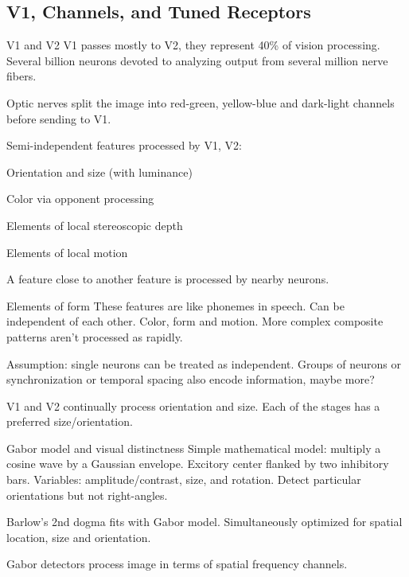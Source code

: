 \begin{mdframed}\begin{multicols}{2}
\subsection{V1, Channels, and Tuned Receptors}
\begin{compactdesc}
    \item[V1 and V2] V1 passes mostly to V2, they represent 40\% of vision
        processing. Several billion neurons devoted to analyzing output from
        several million nerve fibers.
    \item[Optic nerves] split the image into red-green, yellow-blue and
        dark-light channels before sending to V1.
    \item[Semi-independent features] processed by V1, V2:
        \begin{compactenum}
        \item Orientation and size (with luminance)
        \item Color via opponent processing
        \item Elements of local stereoscopic depth
        \item Elements of local motion
        \end{compactenum}
        A feature close to another feature is processed by nearby neurons.
    \item[Elements of form] These features are like phonemes in speech.
        Can be independent of each other. Color, form and motion.
        More complex composite patterns aren't processed as rapidly.
    \item[Assumption:] single neurons can be treated as independent.
        Groups of neurons or synchronization or temporal spacing also encode
        information, maybe more?
    \item[V1 and V2] continually process orientation and size. Each of the stages
        has a preferred size/orientation.
    \item[Gabor model and visual distinctness] Simple mathematical model:
        multiply a cosine wave by a Gaussian envelope. Excitory center flanked
        by two inhibitory bars. Variables: amplitude/contrast, size, and
        rotation. Detect particular orientations but not right-angles.
    \item[Barlow's 2nd dogma] fits with Gabor model. Simultaneously optimized
        for spatial location, size and orientation.
    \item[Gabor detectors] process image in terms of spatial frequency channels.

\end{compactdesc}
\end{multicols}
\end{mdframed}

